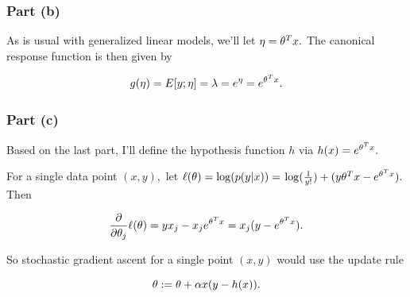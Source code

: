\documentclass[]{article}
\begin{document}
\subsubsection{Part (b)}\label{part-b-1}

As is usual with generalized linear models, we'll let \(\eta = \theta^Tx.\)
The canonical response function is then given by

\[g(\eta) = E[y;\eta] = \lambda = e^\eta = e^{\theta^Tx}.\]

\subsubsection{Part (c)}\label{part-c-1}

Based on the last part, I'll define the hypothesis function \(h\) via
\(h(x) = e^{\theta^Tx}.\)

For a single data point \((x, y),\) let \(\ell(\theta) = \log(p(y|x)) =\)
\(\log(\frac{1}{y!}) + (y\theta^T x-e^{\theta^Tx}).\) Then

\[\frac{\partial}{\partial\theta_j}\ell(\theta) = yx_j - x_je^{\theta^Tx}
= x_j(y-e^{\theta^Tx}).\]

So stochastic gradient ascent for a single point \((x, y)\) would use
the update rule

\[\theta := \theta + \alpha x(y - h(x)).\]
\end{document}
